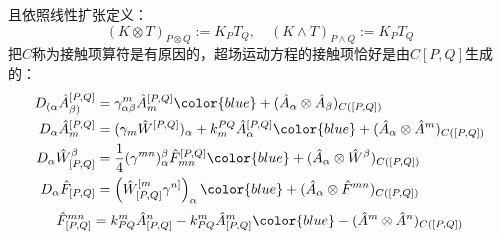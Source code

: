 且依照线性扩张定义：
\begin{equation}
	(K\otimes T)_{P\otimes Q}:=K_PT_Q,\quad(K\wedge T)_{P\wedge Q}:=K_PT_Q
\end{equation}
把$C$称为接触项算符是有原因的，超场运动方程的接触项恰好是由$C[P,Q]$生成的：
\begin{equation}
\begin{aligned}
	D_{(\alpha}\hat{A}_{\beta)}^{[P,Q]}&=\gamma_{\alpha\beta}^m\hat{A}_m^{[P, {Q}]}{\color{blue}+(\hat{A}_\alpha\otimes\hat{A}_\beta)_{ {C}([P, {Q}])}}
	\\D_\alpha\hat{A}_m^{[P,Q]}&=(\gamma_m\hat{W}^{[P, {Q}]})_\alpha+k_m^{ {PQ}}\hat{A}_\alpha^{[P, {Q}]}{\color{blue}+(\hat{A}_\alpha\otimes\hat{A}^m)_{ {C}([P, {Q}])}}
	\\D_\alpha\hat{W}_{[P, {Q}]}^\beta&=\frac{1}{4}(\gamma^{mn})_\alpha^\beta\hat{F}_{mn}^{[P,Q]}{\color{blue}+(\hat{A}_\alpha\otimes\hat{W}^\beta)_{C([P,Q])}}
	\\D_\alpha\hat{F}_{[P,Q]}&=\left(\hat{W}_{[P,Q]}^{[m}\gamma^{n]}\right)_\alpha{\color{blue}+(\hat{A}_\alpha\otimes\hat{F}^{mn})_{ {C}([P,Q])}}
\end{aligned}
\end{equation}
\begin{equation}
	\label{eq:6.35}
	\hat{F}_{[P,Q]}^{mn}=k_{PQ}^m\hat{A}_{[P,Q]}^n-k_{PQ}^m\hat{A}_{[P,Q]}^m{\color{blue}-(\hat{A}^m\otimes\hat{A}^n)_{C([P,Q])}}
\end{equation}
